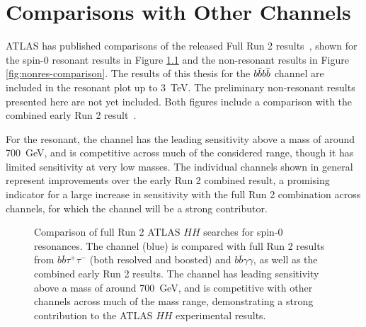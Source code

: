 \chapter{Comparisons with Other Channels}
\label{chap:compare}
ATLAS has published comparisons of the released Full Run 2 results~\cite{ATL-PHYS-PUB-2021-031}, shown for the 
spin-0 resonant results in Figure \ref{fig:res-comparison} and the non-resonant results in Figure 
\ref{fig:nonres-comparison}. 
The results of this thesis for the $b\bar{b}b\bar{b}$ channel are included in the resonant plot up to \SI{3}{\TeV}. The 
preliminary non-resonant results presented here are not yet included. Both figures include a comparison with the 
combined early Run 2 result~\cite{HDBS-2018-58}.

For the resonant, the \bbbb channel has the leading sensitivity above a mass of around \SI{700}{\GeV}, and 
is competitive across much of the considered range, though it has limited sensitivity at very low masses. The 
individual channels shown in general represent improvements over the early Run 2 combined result, a promising 
indicator for a large increase in sensitivity with the full Run 2 combination across channels, for which the 
\bbbb channel will be a strong contributor.

\begin{figure}[ht]
\centering
{}

\caption{\label{fig:res-comparison} Comparison of full Run 2 ATLAS $HH$ searches for spin-0 resonances. The \bbbb 
channel (blue) is compared with full Run 2 results from $b\bar{b}\tau^{+}\tau^{-}$ (both resolved and boosted) and  
$b\bar{b}\gamma\gamma$, as well as the combined early Run 2 results. The \bbbb channel has leading sensitivity above 
a mass of around \SI{700}{\GeV}, and is competitive with other channels across much of the mass range, demonstrating 
a strong contribution to the ATLAS $HH$ experimental results.~\cite{ATL-PHYS-PUB-2021-031}}
\end{figure}

